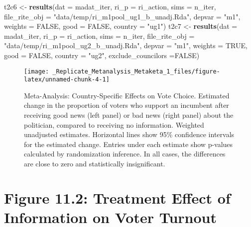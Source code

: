 \documentclass[]{article}
\newenvironment{Shaded}{\begin{snugshade}}{\end{snugshade}}
\newcommand{\KeywordTok}[1]{\textcolor[rgb]{0.13,0.29,0.53}{\textbf{#1}}}
\newcommand{\DataTypeTok}[1]{\textcolor[rgb]{0.13,0.29,0.53}{#1}}
\newcommand{\StringTok}[1]{\textcolor[rgb]{0.31,0.60,0.02}{#1}}
\newcommand{\OtherTok}[1]{\textcolor[rgb]{0.56,0.35,0.01}{#1}}
\newcommand{\NormalTok}[1]{#1}
\begin{document}
\begin{Shaded}
\begin{Highlighting}[]
\NormalTok{  t2c6 <-}\StringTok{ }\KeywordTok{results}\NormalTok{(}\DataTypeTok{dat =}\NormalTok{ madat_iter, }\DataTypeTok{ri_p =}\NormalTok{ ri_action, }\DataTypeTok{sims =}\NormalTok{ n_iter,}
                  \DataTypeTok{file_rite_obj =} \StringTok{"data/temp/ri_m1pool_ug1_b_unadj.Rda"}\NormalTok{,}
                  \DataTypeTok{depvar =} \StringTok{"m1"}\NormalTok{, }\DataTypeTok{weights =} \OtherTok{FALSE}\NormalTok{, }\DataTypeTok{good =} \OtherTok{FALSE}\NormalTok{, }\DataTypeTok{country =} \StringTok{"ug1"}\NormalTok{)}
\NormalTok{  t2c7 <-}\StringTok{ }\KeywordTok{results}\NormalTok{(}\DataTypeTok{dat =}\NormalTok{ madat_iter, }\DataTypeTok{ri_p =}\NormalTok{ ri_action, }\DataTypeTok{sims =}\NormalTok{ n_iter,}
                  \DataTypeTok{file_rite_obj =} \StringTok{"data/temp/ri_m1pool_ug2_b_unadj.Rda"}\NormalTok{,}
                  \DataTypeTok{depvar =} \StringTok{"m1"}\NormalTok{, }\DataTypeTok{weights =} \OtherTok{TRUE}\NormalTok{,  }\DataTypeTok{good =} \OtherTok{FALSE}\NormalTok{, }\DataTypeTok{country =} \StringTok{"ug2"}\NormalTok{, }
                  \DataTypeTok{exclude_councilors =}\OtherTok{FALSE}\NormalTok{)}
\end{Highlighting}
\end{Shaded}

\begin{figure}

{\centering \texttt{[image: \_Replicate\_Metanalysis\_Metaketa\_1\_files/figure-latex/unnamed-chunk-4-1]} 

}

\caption{Meta-Analysis: Country-Specific Effects on Vote Choice. Estimated change in the proportion of voters who support an incumbent after receiving good news (left panel) or bad news (right panel) about the politician, compared to receiving no information. Weighted unadjusted estimates. Horizontal lines show 95\% confidence intervals for the estimated change. Entries under each estimate show p-values calculated by randomization inference. In all cases, the differences are close to zero and statistically insignificant.}\label{fig:unnamed-chunk-4}
\end{figure}

\clearpage

\section{Figure 11.2: Treatment Effect of Information on Voter
Turnout}\label{figure-11.2-treatment-effect-of-information-on-voter-turnout}
\end{document}
